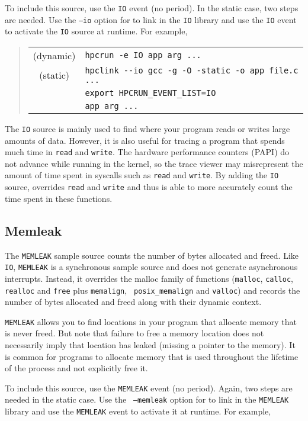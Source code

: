 To include this source, use the {\tt IO} event (no period).  In the
static case, two steps are needed.  Use the {\tt --io} option for
\hpclink{} to link in the {\tt IO} library and use the {\tt IO} event
to activate the {\tt IO} source at runtime.  For example,

\begin{quote}
\begin{tabular}{@{}cl}
(dynamic) & \verb|hpcrun -e IO app arg ...| \\
(static)  & \verb|hpclink --io gcc -g -O -static -o app file.c ...| \\
& \verb|export HPCRUN_EVENT_LIST=IO| \\
& \verb|app arg ...|
\end{tabular}
\end{quote}

The {\tt IO} source is mainly used to find where your program reads or
writes large amounts of data.  However, it is also useful for tracing
a program that spends much time in {\tt read} and {\tt write}.  The
hardware performance counters (PAPI) do not advance while running in
the kernel, so the trace viewer may misrepresent the amount of time
spent in syscalls such as {\tt read} and {\tt write}.  By adding the
{\tt IO} source, \hpcrun{} overrides {\tt read} and {\tt write} and
thus is able to more accurately count the time spent in these
functions.

\subsection{Memleak}

The {\tt MEMLEAK} sample source counts the number of bytes allocated
and freed.  Like {\tt IO}, {\tt MEMLEAK} is a synchronous sample
source and does not generate asynchronous interrupts.  Instead, it
overrides the malloc family of functions ({\tt malloc}, {\tt calloc},
{\tt realloc} and {\tt free} plus {\tt memalign}, {\tt
posix\_memalign} and {\tt valloc}) and records the number of bytes
allocated and freed along with their dynamic context.

{\tt MEMLEAK} allows you to find locations in your program that
allocate memory that is never freed.  But note that failure to free a
memory location does not necessarily imply that location has leaked
(missing a pointer to the memory).  It is common for programs to
allocate memory that is used throughout the lifetime of the process
and not explicitly free it.

To include this source, use the {\tt MEMLEAK} event (no period).
Again, two steps are needed in the static case.  Use the {\tt
--memleak} option for \hpclink{} to link in the {\tt MEMLEAK} library
and use the {\tt MEMLEAK} event to activate it at runtime.  For
example,


